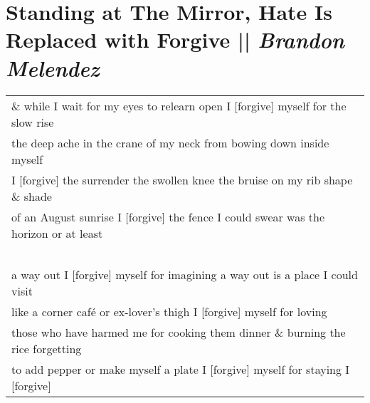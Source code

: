 \section[Standing at The Mirror, Hate Is Replaced with Forgive]{Standing at The Mirror, Hate Is Replaced with Forgive || \emph{Brandon Melendez} \hspace*{\fill}  \thepage}
\begin{center} 
\hspace{0pt}
\vfill
\begin{tabular}{l}
\& while I wait for my eyes to relearn open \hspace{3mm} I [forgive] myself \hspace{3mm} for the slow rise\\ 
the deep ache in the crane of my neck \hspace{3mm} \hspace{3mm} from bowing down inside myself \\
I [forgive] the surrender the swollen knee \hspace{3mm} the bruise on my rib \hspace{3mm} shape \& shade\\ of an August sunrise \hspace{3mm} I [forgive] the fence \hspace{3mm} I could swear was the horizon \hspace{3mm} or at least\\

\-\ \\ a way out \hspace{3mm} I [forgive] myself for imagining \hspace{3mm} a way out is a place I could visit\\ like a corner café or ex-lover’s thigh \hspace{3mm} I [forgive] myself for loving\\
those who have harmed me \hspace{3mm} for cooking them dinner \& burning the rice \hspace{3mm} forgetting\\ to add pepper or make myself a plate \hspace{3mm} I [forgive] myself for staying \hspace{3mm} I [forgive]\\


\end{tabular}
\end{center}

